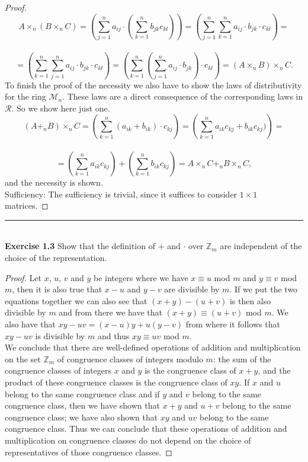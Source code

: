 \documentclass[a4paper]{article}
\begin{document}
\begin{proof}
$$A \times_{n} (B \times_{n} C) = \left(\sum_{j=1}^{n}{a_{ij}} \cdot \left( \sum_{k=1}^{n}{b_{jk}c_{kl}}\right)\right) = \left(\sum_{j=1}^{n}\sum_{k=1}^{n}{a_{ij} \cdot b_{jk} \cdot c_{kl}} \right)=$$\\ $$= \left(\sum_{k=1}^{n}\sum_{j=1}^{n}{a_{ij} \cdot b_{jk} \cdot c_{kl}}\right) = \left( \sum_{k=1}^{n}\left(\sum_{j=1}^{n}{a_{ij} \cdot b_{jk}} \right) \cdot c_{kl} \right) = (A \times_{n} B) \times_{n} C.$$
To finish the proof of the necessity we also have to show the laws of distributivity for the ring $\mathcal{M}_{n}$. These laws are a direct consequence of the corresponding laws in $\mathcal{R}$. So we show here just one.
$$(A +_{n} B) \times_{n} C = \left(\sum_{k=1}^{n}{(a_{ik}+b_{ik}) \cdot c_{kj}}\right) = \left(\sum_{k=1}^{n}{a_{ik}c_{kj}+b_{ik}c_{kj})}\right)=$$\\ $$= \left(\sum_{k=1}^{n}{a_{ik}c_{kj}}\right) + \left(\sum_{k=1}^{n}{b_{ik}c_{kj}}\right) = A \times_{n} C +_{n} B \times_{n} C,$$
and the necessity is shown.\\
Sufficiency: The sufficiency is trivial, since it suffices to consider $1 \times 1$ matrices.
\end{proof}



\noindent\rule{12cm}{0.4pt}\\
\noindent \textbf{Exercise 1.3} Show that the definition of $+$ and $\cdot$ over $\mathbb{Z}_m$ are independent of the choice of the representation.
\begin{proof}
Let $x$, $u$, $v$ and $y$ be integers where we have $x \equiv u$ mod $m$ and $y \equiv v$ mod $m$, then it is also true that $x -u$ and $y - v$ are divisible by $m$. If we put the two equations together we can also see that $(x + y) - (u + v)$ is then also divisible by $m$ and from there we have that $(x+y) \equiv (u+v)$ mod $m$. We also have that $xy - uv = (x-u)y + u(y-v)$ from where it follows that $xy-uv$ is divisible by $m$ and thus $xy \equiv uv$ mod $m$.\\
We conclude that there are well-defined operations of addition and multiplication on the set $\mathbb{Z}_{m}$ of congruence classes of integers modulo $m$: the sum of the congruence classes of integers $x$ and $y$ is the congruence class of $x+y$, and the product of these congruence classes is the congruence class of $xy$. If $x$ and $u$ belong to the same congruence class and if $y$ and $v$ belong to the same congruence class, then we have shown that $x+y$ and $u+v$ belong to the same congruence class; we have also shown that $xy$ and $uv$ belong to the same congruence class. Thus we can conclude that these operations of addition and multiplication on congruence classes do not depend on the choice of representatives of those congruence classes.
\end{proof}
\end{document}
